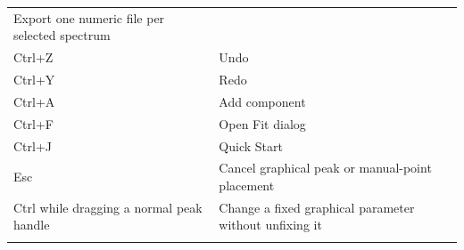 \documentclass[
  10pt,
  a4paper,
  oneside]{scrreprt}
\begin{document}
\begin{longtable}[]{@{}ll@{}}
\begin{minipage}[t]{0.47\columnwidth}
Export one numeric file per selected spectrum\strut
\end{minipage}\tabularnewline
\begin{minipage}[t]{0.47\columnwidth}\raggedright
Ctrl+Z\strut
\end{minipage} & \begin{minipage}[t]{0.47\columnwidth}\raggedright
Undo\strut
\end{minipage}\tabularnewline
\begin{minipage}[t]{0.47\columnwidth}\raggedright
Ctrl+Y\strut
\end{minipage} & \begin{minipage}[t]{0.47\columnwidth}\raggedright
Redo\strut
\end{minipage}\tabularnewline
\begin{minipage}[t]{0.47\columnwidth}\raggedright
Ctrl+A\strut
\end{minipage} & \begin{minipage}[t]{0.47\columnwidth}\raggedright
Add component\strut
\end{minipage}\tabularnewline
\begin{minipage}[t]{0.47\columnwidth}\raggedright
Ctrl+F\strut
\end{minipage} & \begin{minipage}[t]{0.47\columnwidth}\raggedright
Open Fit dialog\strut
\end{minipage}\tabularnewline
\begin{minipage}[t]{0.47\columnwidth}\raggedright
Ctrl+J\strut
\end{minipage} & \begin{minipage}[t]{0.47\columnwidth}\raggedright
Quick Start\strut
\end{minipage}\tabularnewline
\begin{minipage}[t]{0.47\columnwidth}\raggedright
Esc\strut
\end{minipage} & \begin{minipage}[t]{0.47\columnwidth}\raggedright
Cancel graphical peak or manual-point placement\strut
\end{minipage}\tabularnewline
\begin{minipage}[t]{0.47\columnwidth}\raggedright
Ctrl while dragging a normal peak handle\strut
\end{minipage} & \begin{minipage}[t]{0.47\columnwidth}\raggedright
Change a fixed graphical parameter without unfixing it\strut
\end{minipage}\tabularnewline
\begin{minipage}[t]{0.47\columnwidth}\raggedright

\end{minipage}
\end{longtable}
\end{document}
